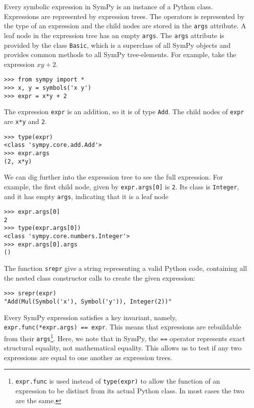 

Every symbolic expression in SymPy is an instance of a Python class.
Expressions are represented by expression trees. The operators is represented
by the type of an expression and the child nodes are stored in the
\texttt{args} attribute. A leaf node in the expression tree has an empty
\texttt{args}.
The \texttt{args} attribute is provided by the class \texttt{Basic},
which is a superclass of all SymPy objects and
provides common methods to all SymPy tree-elements.
For example, take the expression $xy + 2$.

\begin{verbatim}
>>> from sympy import *
>>> x, y = symbols('x y')
>>> expr = x*y + 2
\end{verbatim}

The expression \texttt{expr} is an addition, so it is of type \texttt{Add}. The child
nodes of \texttt{expr} are \texttt{x*y} and \texttt{2}.

\begin{verbatim}
>>> type(expr)
<class 'sympy.core.add.Add'>
>>> expr.args
(2, x*y)
\end{verbatim}

We can dig further into the expression tree to see the full expression. For
example, the first child node, given by \texttt{expr.args[0]} is
\texttt{2}. Its class is \texttt{Integer}, and it has empty \texttt{args},
indicating that it is a leaf node

\begin{verbatim}
>>> expr.args[0]
2
>>> type(expr.args[0])
<class 'sympy.core.numbers.Integer'>
>>> expr.args[0].args
()
\end{verbatim}

The function \texttt{srepr} give a string representing a valid Python code,
containing all the nested class constructor calls to create the given expression:

\begin{verbatim}
>>> srepr(expr)
"Add(Mul(Symbol('x'), Symbol('y')), Integer(2))"
\end{verbatim}

Every SymPy expression satisfies a key invariant, namely,
\texttt{expr.func(*expr.args) == expr}. This means that expressions are
rebuildable from their \texttt{args}\footnote{\texttt{expr.func} is used
  instead of \texttt{type(expr)} to allow the function of an expression to be
  distinct from its actual Python class. In most cases the two are the same.}.
Here, we note that in SymPy, the \texttt{==} operator represents exact
structural equality, not mathematical equality. This allows us to test if any
two expressions are equal to one another as expression trees.


